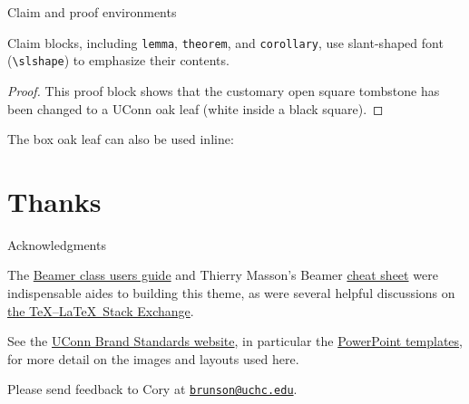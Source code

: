 \documentclass{beamer}
\begin{document}
\begin{frame}[fragile]{Claim and proof environments}

\begin{theorem}
Claim blocks, including \verb|lemma|, \verb|theorem|, and \verb|corollary|, use slant-shaped font (\verb|\slshape|) to emphasize their contents.
\end{theorem}

\begin{proof}
This proof block shows that the customary open square tombstone has been changed to a UConn oak leaf (white inside a black square).
\end{proof}

\begin{corollary}
The box oak leaf can also be used inline: \oakleafbox
\end{corollary}

\end{frame}


\section{Thanks}


\begin{frame}{Acknowledgments}

The \href{http://tug.ctan.org/macros/latex/contrib/beamer/doc/beameruserguide.pdf}{Beamer class users guide} and Thierry Masson's Beamer \href{http://www.cpt.univ-mrs.fr/~masson/latex/Beamer-appearance-cheat-sheet.pdf}{cheat sheet} were indispensable aides to building this theme, as were several helpful discussions on \href{https://tex.stackexchange.com/}{the \TeX--\LaTeX\ Stack Exchange}.

See the \href{http://brand.uconn.edu/}{UConn Brand Standards website}, in particular the \href{http://brand.uconn.edu/resources/powerpoint-templates/}{PowerPoint templates}, for more detail on the images and layouts used here.

Please send feedback to Cory at \href{mailto:brunson@uchc.edu}{\tt brunson@uchc.edu}.

\end{frame}
\end{document}
